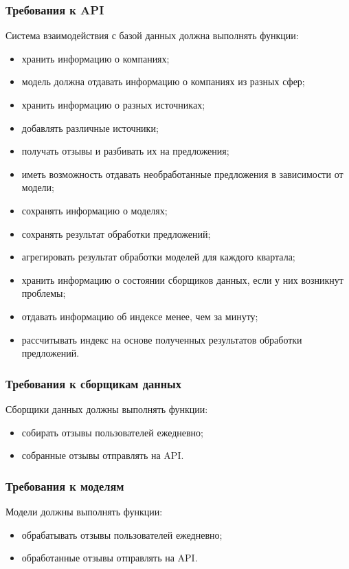 {\subsubsection{Требования к API}
Система взаимодействия с базой данных должна выполнять функции:
\begin{itemize}
  \item хранить информацию о компаниях;
  \item модель должна отдавать информацию о компаниях из разных сфер;
  \item хранить информацию о разных источниках;
  \item добавлять различные источники;
  \item получать отзывы и разбивать их на предложения;
  \item иметь возможность отдавать необработанные предложения в зависимости от модели;
  \item сохранять информацию о моделях;
  \item сохранять результат обработки предложений;
  \item агрегировать результат обработки моделей для каждого квартала;
  \item хранить информацию о состоянии сборщиков данных, если у них возникнут проблемы;
  \item отдавать информацию об индексе менее, чем за минуту;
  \item рассчитывать индекс на основе полученных результатов обработки предложений.
\end{itemize}
\subsubsection{Требования к сборщикам данных}
Сборщики данных должны выполнять функции:
\begin{itemize}
  \item собирать отзывы пользователей ежедневно;
  \item собранные отзывы отправлять на API.
\end{itemize}
\subsubsection{Требования к моделям}
Модели должны выполнять функции:
\begin{itemize}
  \item обрабатывать отзывы пользователей ежедневно;
  \item обработанные отзывы отправлять на API.
\end{itemize}
}
